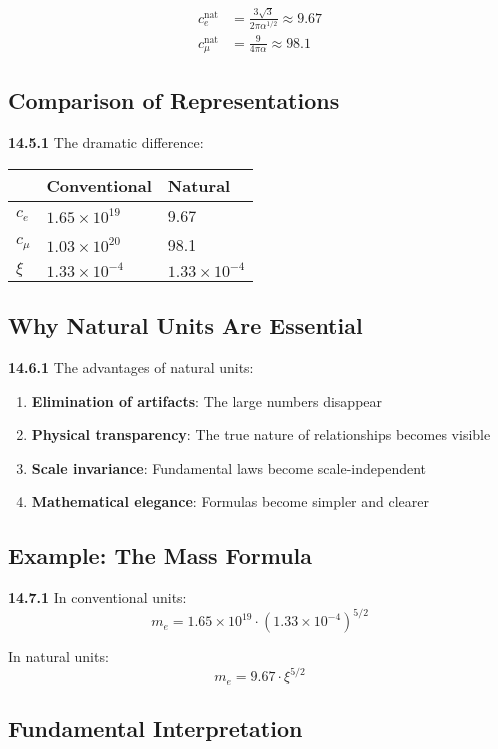 \documentclass[12pt,a4paper]{article}
\begin{document}
\begin{align*}
	c_e^{\text{nat}} &= \frac{3\sqrt{3}}{2\pi\alpha^{1/2}} \approx 9.67 \\
	c_\mu^{\text{nat}} &= \frac{9}{4\pi\alpha} \approx 98.1
\end{align*}

\subsection{Comparison of Representations}

\noindent \textbf{14.5.1} The dramatic difference:

\begin{tabular}{lll}
	& Conventional & Natural \\
	\midrule
	$c_e$ & $1.65 \times 10^{19}$ & 9.67 \\
	$c_\mu$ & $1.03 \times 10^{20}$ & 98.1 \\
	$\xi$ & $1.33 \times 10^{-4}$ & $1.33 \times 10^{-4}$ \\
\end{tabular}

\subsection{Why Natural Units Are Essential}

\noindent \textbf{14.6.1} The advantages of natural units:
\begin{enumerate}
	\item \textbf{Elimination of artifacts}: The large numbers disappear
	\item \textbf{Physical transparency}: The true nature of relationships becomes visible
	\item \textbf{Scale invariance}: Fundamental laws become scale-independent
	\item \textbf{Mathematical elegance}: Formulas become simpler and clearer
\end{enumerate}

\subsection{Example: The Mass Formula}

\noindent \textbf{14.7.1} In conventional units:
\[
m_e = 1.65 \times 10^{19} \cdot (1.33 \times 10^{-4})^{5/2}
\]

In natural units:
\[
m_e = 9.67 \cdot \xi^{5/2}
\]

\subsection{Fundamental Interpretation}
\end{document}
